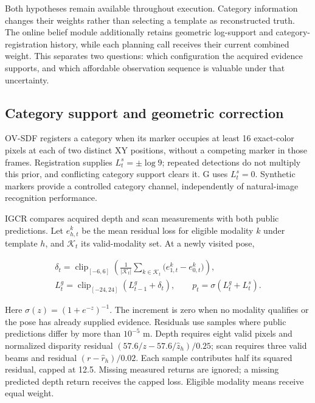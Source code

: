 \documentclass[pdflatex,sn-mathphys-num]{sn-jnl}
\begin{document}
Both hypotheses remain available throughout execution. Category information changes their weights rather than selecting a template as reconstructed truth. The online belief module additionally retains geometric log-support and category-registration history, while each planning call receives their current combined weight. This separates two questions: which configuration the acquired evidence supports, and which affordable observation sequence is valuable under that uncertainty.

\hypertarget{category-support-and-geometric-correction}{%
\subsection{Category support and geometric correction}\label{category-support-and-geometric-correction}}

OV-SDF registers a category when its marker occupies at least 16 exact-color pixels at each of two distinct XY positions, without a competing marker in those frames. Registration supplies \(L_t^s=\pm\log9\); repeated detections do not multiply this prior, and conflicting category support clears it. G uses \(L_t^s=0\). Synthetic markers provide a controlled category channel, independently of natural-image recognition performance.

IGCR compares acquired depth and scan measurements with both public predictions. Let \(e_{h,t}^{k}\) be the mean residual loss for eligible modality \(k\) under template \(h\), and \(\mathcal K_t\) its valid-modality set. At a newly visited pose,

\[
\begin{aligned}
\delta_t=\operatorname{clip}_{[-6,6]}
\left(\frac{1}{|\mathcal K_t|}\sum_{k\in\mathcal K_t}
\bigl(e_{1,t}^{k}-e_{0,t}^{k}\bigr)\right),\\
L_t^g=\operatorname{clip}_{[-24,24]}(L_{t-1}^g+\delta_t),\qquad
p_t=\sigma(L_t^g+L_t^s).
\end{aligned}
\]

Here \(\sigma(z)=(1+e^{-z})^{-1}\). The increment is zero when no modality qualifies or the pose has already supplied evidence. Residuals use samples where public predictions differ by more than \(10^{-5}\) m. Depth requires eight valid pixels and normalized disparity residual \((57.6/z-57.6/\widehat z_h)/0.25\); scan requires three valid beams and residual \((r-\widehat r_h)/0.02\). Each sample contributes half its squared residual, capped at 12.5. Missing measured returns are ignored; a missing predicted depth return receives the capped loss. Eligible modality means receive equal weight.
\end{document}
